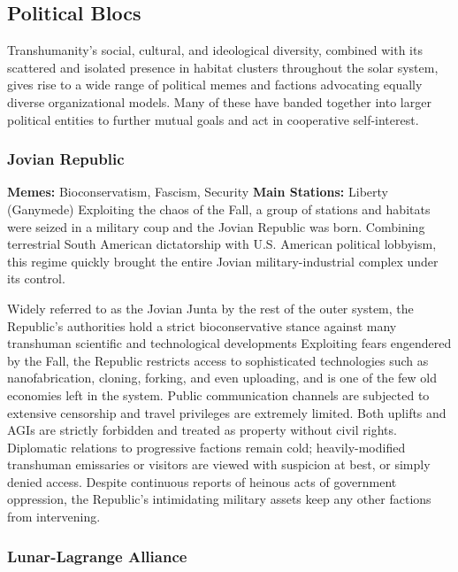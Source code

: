 \subsection{Political Blocs}

Transhumanity's social, cultural, and ideological 
diversity, combined with its scattered and isolated 
presence in habitat clusters throughout the solar 
system, gives rise to a wide range of political memes 
and factions advocating equally diverse organizational 
models. Many of these have banded together into 
larger political entities to further mutual goals and act 
in cooperative self-interest.

\subsubsection{Jovian Republic}

\textbf{Memes:} Bioconservatism, Fascism, Security
\textbf{Main Stations:} Liberty (Ganymede)
Exploiting the chaos of the Fall, a group of stations 
and habitats were seized in a military coup and the 
Jovian Republic was born. Combining terrestrial 
South American dictatorship with U.S. American political
lobbyism, this regime quickly brought the entire
Jovian military-industrial complex under its control.

Widely referred to as the 
Jovian Junta by the rest of the 
outer system, the Republic's
authorities hold a
strict bioconservative 
stance against many 
transhuman scientific 
and technological developments
Exploiting fears
engendered by the Fall, the Republic
restricts access to sophisticated
technologies such as nanofabrication, cloning,
forking, and even uploading, and is one of the few 
old economies left in the system. Public communication
channels are subjected to extensive censorship
and travel privileges are extremely limited. Both 
uplifts and AGIs are strictly forbidden and treated 
as property without civil rights. Diplomatic relations 
to progressive factions remain cold; heavily-modified 
transhuman emissaries or visitors are viewed with 
suspicion at best, or simply denied access. Despite 
continuous reports of heinous acts of government 
oppression, the Republic's intimidating military assets 
keep any other factions from intervening.

\subsubsection{Lunar-Lagrange Alliance}

